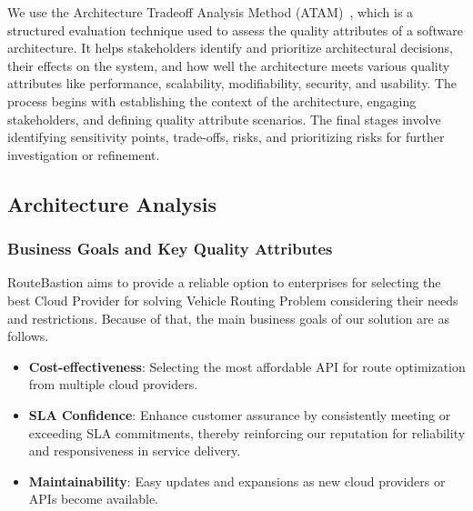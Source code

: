 We use the Architecture Tradeoff Analysis Method (ATAM)~\cite{atam}, which is a structured evaluation technique used to assess the quality attributes of a software architecture. It helps stakeholders identify and prioritize architectural decisions, their effects on the system, and how well the architecture meets various quality attributes like performance, scalability, modifiability, security, and usability. The process begins with establishing the context of the architecture, engaging stakeholders, and defining quality attribute scenarios. The final stages involve identifying sensitivity points, trade-offs, risks, and prioritizing risks for further investigation or refinement.

\subsection{Architecture Analysis}

\subsubsection{Business Goals and Key Quality Attributes}
\label{subsubsec:bg_kqa}

RouteBastion aims to provide a reliable option to enterprises for selecting the best Cloud Provider for solving Vehicle Routing Problem considering their needs and restrictions. Because of that, the main business goals of our solution are as follows.




\begin{itemize}
    \item \textbf{Cost-effectiveness}: Selecting the most affordable API for route optimization from multiple cloud providers.
    
   
    \item \textbf{SLA Confidence}: Enhance customer assurance by consistently meeting or exceeding SLA commitments, thereby reinforcing our reputation for reliability and responsiveness in service delivery.
     \item \textbf{Maintainability}: Easy updates and expansions as new cloud providers or APIs become available.
\end{itemize}

